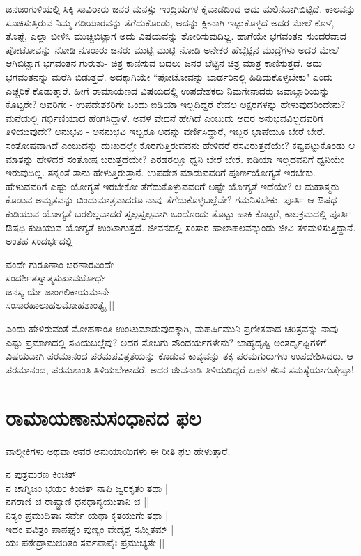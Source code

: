 ಜನಜಂಗುಳಿಯಲ್ಲಿ ಸಿಕ್ಕಿ ಸಾವಿರಾರು ಜನರ ಮನಸ್ಸು ಇಂದ್ರಿಯಗಳ ಕೈವಾಡದಿಂದ ಅದು ಮಲಿನವಾಗಿಬಿಟ್ಟಿದೆ. ಕಾಲವನ್ನು ಸೂಚಿಸುತ್ತಿರುವ ನಿಮ್ಮ ಗಡಿಯಾರವನ್ನು ತೆಗೆದುಕೊಂಡು, ಅದನ್ನು ಕ್ಲೀನಾಗಿ ಇಟ್ಟುಕೊಳ್ಳದೆ ಅದರ ಮೇಲೆ ಕೊಳೆ, ತೊಪ್ಪೆ, ಎಲ್ಲಾ ಬೀಳಿಸಿ ಮುಚ್ಚಿಬಿಟ್ಟಾಗ ಅದು ವಿಷಯವನ್ನು ತೋರಿಸುವುದಿಲ್ಲ. ಹಾಗೆಯೇ ಭಗವಂತನ ಸುಂದರವಾದ ಪೋಟೋವನ್ನು ನೋಡಿ ನೂರಾರು ಜನರು ಮುಟ್ಟಿ ಮುಟ್ಟಿ ನೋಡಿ ಅನೇಕರ ಹೆಬ್ಬೆಟ್ಟಿನ ಮುದ್ರೆಗಳು ಅದರ ಮೇಲೆ ಆಗಿಬಿಟ್ಟಾಗ ಭಗವಂತನ ಗುರುತು- ಚಿತ್ರ ಕಾಣಿಸುವ ಬದಲು ಜನರ ಬೆಟ್ಟಿನ ಚಿತ್ರ ಮಾತ್ರ ಕಾಣಿಸುತ್ತದೆ. ಅದು ಭಗವಂತನನ್ನು ಮರೆಸಿ ಬಿಡುತ್ತದೆ. ಅದಕ್ಕಾಗಿಯೇ ``ಪೋಟೋವನ್ನು ಬಾರ್ಡರಿನಲ್ಲಿ ಹಿಡಿದುಕೊಳ್ಳಬೇಕು" ಎಂದು ಎಚ್ಚರಿಕೆ ಕೊಡುತ್ತಾರೆ. ಹೀಗೆ ರಾಮಾಯಣದ ವಿಷಯದಲ್ಲಿ ಉಪದೇಶಕರು ನಿಮಗೇನಾದರು ಜವಾಬ್ದಾರಿಯನ್ನು ಕೊಟ್ಟರೇ? ಅವರಿಗೇ - ಉಪದೇಶಕರಿಗೇ ಒಂದು ಐಡಿಯಾ ಇಲ್ಲದಿದ್ದರೆ ಕೇವಲ ಅಕ್ಷರಗಳನ್ನು ಹೇಳುವುದರಿಂದೇನು? ಮನೆಯಲ್ಲಿ ಗರ್ಭಿಣಿಯಾದ ಹೆಂಗಸಿದ್ದಾಳೆ. ಅವಳ ವೇದನೆ ಹೇಗಿದೆ ಎಂಬುದು ಅದರ ಅನುಭವವಿಲ್ಲದವರಿಗೆ ತಿಳಿಯುವುದೇ? ಅನುಭವಿ - ಅನನುಭವಿ ಇಬ್ಬರೂ ಅದನ್ನು ವರ್ಣಿಸಿದ್ದಾರೆ, ಇಬ್ಬರ ಭಾಷೆಯೂ ಬೇರೆ ಬೇರೆ. ಸಂತೋಷವಾಗಿದೆ ಎಂಬುದನ್ನು ದುಃಖದಲ್ಲೇ ಕೊರಗುತ್ತಿರುವವನು ಹೇಳಿದರೆ ರಸವಿರುತ್ತದೆಯೇ? ಕಷ್ಟಪಟ್ಟುಕೊಂಡು ಆ ಮಾತನ್ನು ಹೇಳಿದರೆ ಸಂತೋಷ ಬರುತ್ತದೆಯೇ? ಎರಡರಲ್ಲೂ ಧ್ವನಿ ಬೇರೆ ಬೇರೆ. ಐಡಿಯಾ ಇಲ್ಲದವನಿಗೆ ಧ್ವನಿಯೇ ಇರುವುದಿಲ್ಲ. ತನ್ನಂತೆ ತಾನು ಹೇಳುತ್ತಿರುತ್ತಾನೆ. ಉಪದೇಶ ಮಾಡುವವರಿಗೆ ಪೂರ್ಣಯೋಗ್ಯತೆ ಇರಬೇಕು. ಹೇಳುವವರಿಗೆ ಎಷ್ಟು ಯೋಗ್ಯತೆ ಇರಬೇಕೋ ತೆಗೆದುಕೊಳ್ಳುವವರಿಗೆ ಅಷ್ಟೇ ಯೋಗ್ಯತೆ ಇದೆಯೇ? ಆ ಮಹಾತ್ಮರು ಕೊಡುವ ಅಮೃತವನ್ನು ಬಿಂದುಮಾತ್ರವಾದರೂ ನಾವು ತೆಗೆದುಕೊಳ್ಳಬಲ್ಲೆವೇ? ಗಮನಿಸಬೇಕು. ಪೂರ್ತಿ ಆ ಔಷಧ ಕುಡಿಯುವ ಯೋಗ್ಯತೆ ಬರಲಿಲ್ಲವಾದರೆ ಸ್ವಲ್ಪಸ್ವಲ್ಪವಾಗಿ ಒಂದೊಂದು ತೊಟ್ಟು ಹಾಕಿ ಕೊಟ್ಟರೆ, ಕಾಲಕ್ರಮದಲ್ಲಿ ಪೂರ್ತಿ ಔಷಧಿ ಕುಡಿಯುವ ಯೋಗ್ಯತೆ ಉಂಟಾಗುತ್ತದೆ. ಜೀವನದಲ್ಲಿ ಸಂಸಾರ ಹಾಲಾಹಲವನ್ನುಂಡು ಜೀವಿ ತಳಮಳಿಸುತ್ತಿದ್ದಾನೆ. ಅಂತಹ ಸಂದರ್ಭದಲ್ಲಿ- 


\begin{shloka}
ವಂದೇ ಗುರೂಣಾಂ ಚರಣಾರವಿಂದೇ\\ 
ಸಂದರ್ಶಿತಸ್ವಾತ್ಮಸುಖಾವಬೋಧೇ |\\ 
ಜನಸ್ಯ ಯೇ ಜಾಂಗಲಿಕಾಯಮಾನೇ\\ 
ಸಂಸಾರಹಾಲಾಹಲಮೋಹಶಾಂತ್ಯೈ ||
\end{shloka} 


ಎಂದು ಹೇಳಿರುವಂತೆ ಮೋಹಶಾಂತಿ ಉಂಟುಮಾಡುವುದಕ್ಕಾಗಿ, ಮಹರ್ಷಿಮುನಿ ಪ್ರಣೀತವಾದ ಚರಿತ್ರವನ್ನು ನಾವು ಎಷ್ಟು ಪ್ರಮಾಣದಲ್ಲಿ ಸವಿಯಬಲ್ಲೆವು? ಅದರ ಸೊಬಗು ಸೌಂದರ್ಯಗಳೇನು? ಬಾಹ್ಯದೃಷ್ಟಿ ಅಂತರ್ದೃಷ್ಟಿಗಳಿಗೆ ವಿಷಯವಾಗಿ ಪರಮಾನಂದ ಪರಮಪವಿತ್ರತೆಯನ್ನು ಕೊಡುವ ಕಾವ್ಯವನ್ನು ತಕ್ಕ ಪರಮಗುರುಗಳು ಉಪದೇಶಿಸಿದರು. ಆ ಪರಮಾನಂದ, ಪರಮಶಾಂತಿ ತಿಳಿಯಬೇಕಾದರೆ, ಅದರ ಜೀವನಾಡಿ ತಿಳಿಯದಿದ್ದರೆ ಬಹಳ ಕಠಿನ ಸಮಸ್ಯೆಯಾಗುತ್ತೇಪ್ಪಾ! 


\section*{ರಾಮಾಯಣಾನುಸಂಧಾನದ ಫಲ}

ವಾಲ್ಮೀಕಿಗಳು ಅಥವಾ ಅವರ ಅನುಯಾಯಿಗಳು ಈ ರೀತಿ ಫಲ ಹೇಳುತ್ತಾರೆ. 

\begin{shloka} 
ನ ಪುತ್ರಮರಣ ಕಿಂಚಿತ್‍\\
ನ ಚಾಗ್ನಿಜಂ ಭಯಂ ಕಿಂಚಿತ್‍ ನಾಪಿ ಜ್ವರಕೃತಂ ತಥಾ |\\ 
ನಗರಾಣಿ ಚ ರಾಷ್ಟ್ರಾಣಿ ಧನಧಾನ್ಯಯುತಾನಿ ಚ ||\\ 
ನಿತ್ಯಂ ಪ್ರಮುದಿತಾಃ ಸರ್ವೇ ಯಥಾ ಕೃತಯುಗೇ ತಥಾ |\\ 
ಇದಂ ಪವಿತ್ರಂ ಪಾಪಘ್ನಂ ಪುಣ್ಯಂ ವೇದೈಶ್ಚ ಸಮ್ಮಿತಮ್‍ |\\ 
ಯಃ ಪಠೇದ್ರಾಮಚರಿತಂ ಸರ್ವಪಾಪೈಃ ಪ್ರಮುಚ್ಯತೇ ||
\end{shloka} 


